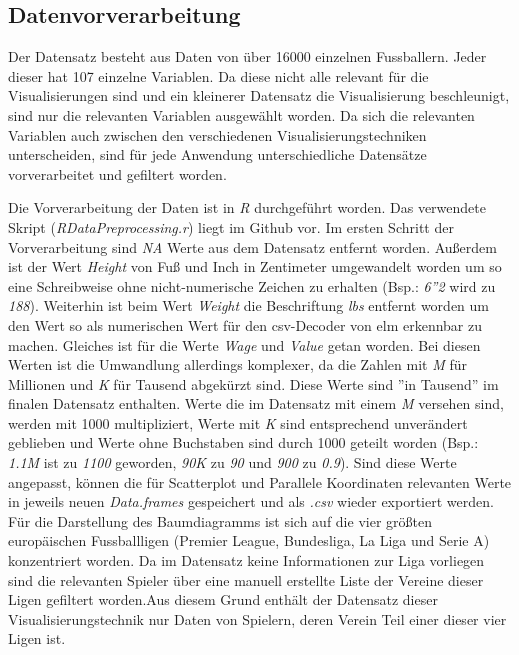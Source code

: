 \documentclass[usegeometry=true]{scrartcl}
\begin{document}
\subsection{\label{Datenvorverarbeitung}Datenvorverarbeitung}

Der Datensatz besteht aus Daten von über 16000 einzelnen Fussballern. Jeder dieser hat 107 einzelne Variablen. Da diese nicht alle relevant für die Visualisierungen sind und ein kleinerer Datensatz die Visualisierung beschleunigt, sind nur die relevanten Variablen ausgewählt worden. Da sich die relevanten Variablen auch zwischen den verschiedenen Visualisierungstechniken unterscheiden, sind für jede Anwendung unterschiedliche Datensätze vorverarbeitet und gefiltert worden.

Die Vorverarbeitung der Daten ist in \textit{R} durchgeführt worden. Das verwendete Skript (\textit{RDataPreprocessing.r}) liegt im Github vor.
Im ersten Schritt der Vorverarbeitung sind \textit{NA} Werte aus dem Datensatz entfernt worden.
Außerdem ist der Wert \textit{Height} von Fuß und Inch in Zentimeter umgewandelt worden um so eine Schreibweise ohne nicht-numerische Zeichen zu erhalten (Bsp.: \textit{6''2} wird zu \textit{188}). Weiterhin ist beim Wert \textit{Weight} die Beschriftung \textit{lbs} entfernt worden um den Wert so als numerischen Wert für den csv-Decoder von elm erkennbar zu machen.
Gleiches ist für die Werte \textit{Wage} und \textit{Value} getan worden. Bei diesen Werten ist die Umwandlung allerdings komplexer, da die Zahlen mit \textit{M} für Millionen und \textit{K} für Tausend abgekürzt sind.
Diese Werte sind ''in Tausend'' im finalen Datensatz enthalten. Werte die im Datensatz mit einem \textit{M} versehen sind, werden mit 1000 multipliziert, Werte mit \textit{K} sind entsprechend unverändert geblieben und Werte ohne Buchstaben sind durch 1000 geteilt worden (Bsp.: \textit{1.1M} ist zu \textit{1100} geworden, \textit{90K} zu \textit{90} und \textit{900} zu \textit{0.9}).
Sind diese Werte angepasst, können die für Scatterplot und Parallele Koordinaten relevanten Werte in jeweils neuen \textit{Data.frames} gespeichert und als \textit{.csv} wieder exportiert werden.\\
Für die Darstellung des Baumdiagramms ist sich auf die vier größten europäischen Fussballligen (Premier League, Bundesliga, La Liga und Serie A) konzentriert worden. Da im Datensatz keine Informationen zur Liga vorliegen sind die relevanten Spieler über eine manuell erstellte Liste der Vereine dieser Ligen gefiltert worden.Aus diesem Grund enthält der Datensatz dieser Visualisierungstechnik nur Daten von Spielern, deren Verein Teil einer dieser vier Ligen ist.
\end{document}
